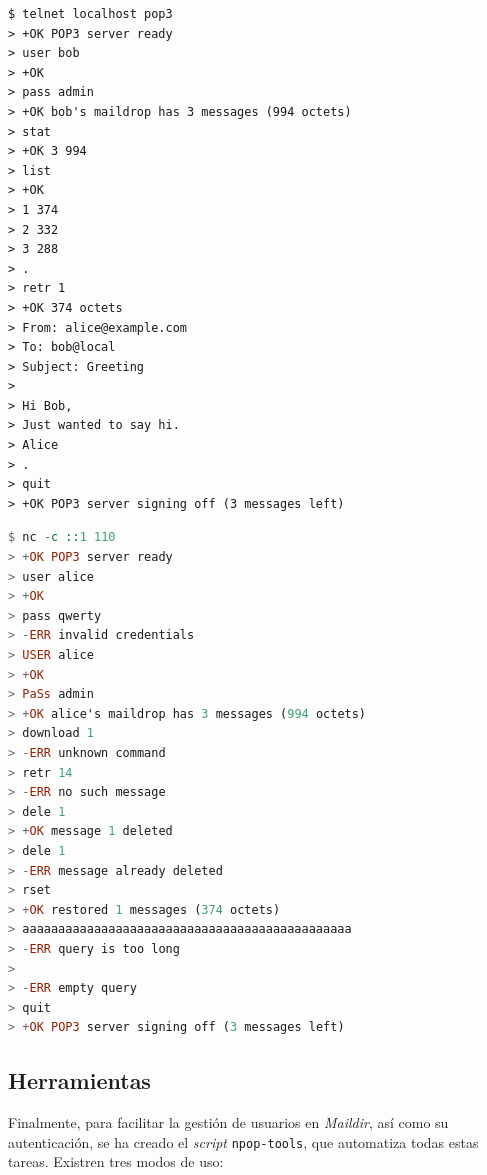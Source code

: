 \documentclass[a4paper]{CSMakotoTechnicalReport}
\begin{document}
\vspace{-16pt}
\begin{minipage}[t]{0.48\textwidth}
\begin{lstlisting}[language={}, numbers=none, basicstyle=\footnotesize]
$ telnet localhost pop3
> +OK POP3 server ready
> user bob
> +OK
> pass admin
> +OK bob's maildrop has 3 messages (994 octets)
> stat
> +OK 3 994
> list
> +OK
> 1 374
> 2 332
> 3 288
> .
> retr 1
> +OK 374 octets
> From: alice@example.com
> To: bob@local
> Subject: Greeting 
> 
> Hi Bob,
> Just wanted to say hi.
> Alice
> .
> quit
> +OK POP3 server signing off (3 messages left)
\end{lstlisting}
\vspace{-4pt}
\captionsetup{type=lstlisting}
\caption{Sesión POP3 correcta, usando telnet.}
\end{minipage}
\hfill
\begin{minipage}[t]{0.49\textwidth}
\begin{lstlisting}[language=Haskell, numbers=none, basicstyle=\footnotesize]
$ nc -c ::1 110
> +OK POP3 server ready
> user alice
> +OK
> pass qwerty
> -ERR invalid credentials
> USER alice
> +OK
> PaSs admin
> +OK alice's maildrop has 3 messages (994 octets)
> download 1
> -ERR unknown command
> retr 14
> -ERR no such message
> dele 1
> +OK message 1 deleted
> dele 1
> -ERR message already deleted
> rset
> +OK restored 1 messages (374 octets)
> aaaaaaaaaaaaaaaaaaaaaaaaaaaaaaaaaaaaaaaaaaaaaa
> -ERR query is too long
>
> -ERR empty query
> quit
> +OK POP3 server signing off (3 messages left)
\end{lstlisting}
\vspace{-4pt}
\captionsetup{type=lstlisting}
\caption{Sesión POP3 con errores, usando netcat.}
\end{minipage}


\subsection{Herramientas}

Finalmente, para facilitar la gestión de usuarios en \textit{Maildir}, así como su autenticación, se ha creado el \textit{script} \texttt{npop-tools}, que automatiza todas estas tareas. Existren tres modos de uso:
\end{document}
